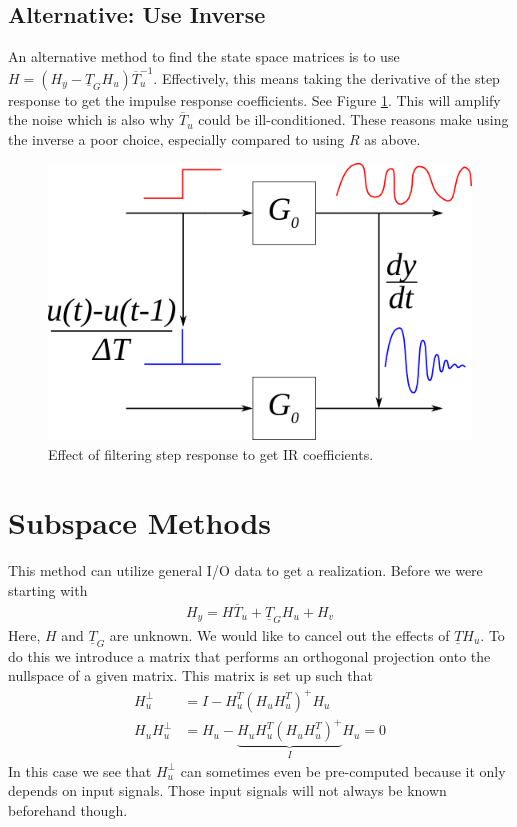 \subsection{Alternative: Use Inverse}
An alternative method to find the state space matrices is to use $H=(H_y-\underline{T}_GH_u)\overline{T}_u^{-1}$. Effectively, this means taking the derivative of the step response to get the impulse response coefficients. See Figure \ref{fig:11filter}. This will amplify the noise which is also why $\overline{T}_u$ could be ill-conditioned. These reasons make using the inverse a poor choice, especially compared to using $R$ as above.

\begin{figure}[ht!]
	\centering
	\includegraphics[width=.5\textwidth]{images/11filter}
	\caption{Effect of filtering step response to get IR coefficients.}
	\label{fig:11filter}
\end{figure}

\section{Subspace Methods}
This method can utilize general I/O data to get a realization. Before we were starting with
\begin{align}
\label{eq:hy}
H_y=H\overline{T}_u+\underline{T}_GH_u+H_v
\end{align}
Here, $H$ and $\underline{T}_G$ are unknown. We would like to cancel out the effects of $\underline{T}H_u$. To do this we introduce a matrix that performs an orthogonal projection onto the nullspace of a given matrix. This matrix is set up such that
\begin{align*}
H_u^\perp &= I-H_u^T(H_uH_u^T)^+H_u \\
H_uH_u^\perp &= H_u - \underbrace{H_uH_u^T(H_uH_u^T)^+}_{I}H_u = 0
\end{align*}
In this case we see that $H_u^\perp$ can sometimes even be pre-computed because it only depends on input signals. Those input signals will not always be known beforehand though.

